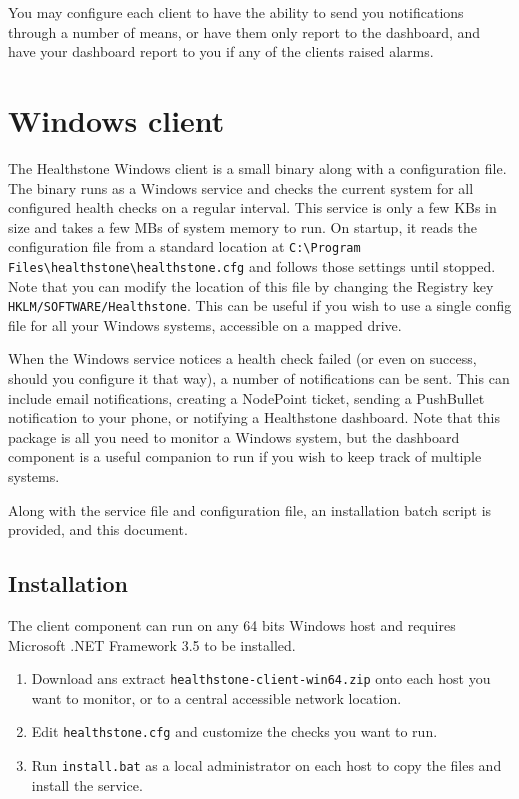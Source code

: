 \documentclass[11pt]{article}
\begin{document}
You may configure each client to have the ability to send you notifications through a number of means, or have them only report to the dashboard, and have your dashboard report to you if any of the clients raised alarms.

\section{Windows client}

The Healthstone Windows client is a small binary along with a configuration file. The binary runs as a Windows service and checks the current system for all configured health checks on a regular interval. This service is only a few KBs in size and takes a few MBs of system memory to run. On startup, it reads the configuration file from a standard location at \texttt{C:\textbackslash Program Files\textbackslash healthstone\textbackslash healthstone.cfg} and follows those settings until stopped. Note that you can modify the location of this file by changing the Registry key \texttt{HKLM/SOFTWARE/Healthstone}. This can be useful if you wish to use a single config file for all your Windows systems, accessible on a mapped drive.

When the Windows service notices a health check failed (or even on success, should you configure it that way), a number of notifications can be sent. This can include email notifications, creating a NodePoint ticket, sending a PushBullet notification to your phone, or notifying a Healthstone dashboard. Note that this package is all you need to monitor a Windows system, but the dashboard component is a useful companion to run if you wish to keep track of multiple systems.

Along with the service file and configuration file, an installation batch script is provided, and this document.

\subsection{Installation}

The client component can run on any 64 bits Windows host and requires Microsoft .NET Framework 3.5 to be installed.

\begin{enumerate}
\item Download ans extract \texttt{healthstone-client-win64.zip} onto each host you want to monitor, or to a central accessible network location.
\item Edit \texttt{healthstone.cfg} and customize the checks you want to run.
\item Run \texttt{install.bat} as a local administrator on each host to copy the files and install the service.
\end{enumerate}
\end{document}
